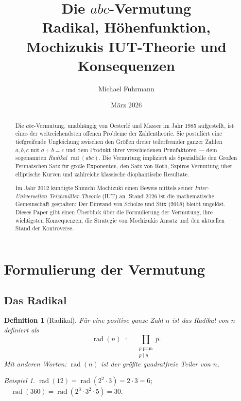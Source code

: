 \documentclass[12pt,a4paper]{article}
\title{\textbf{Die $abc$-Vermutung}\\[0.5em]
\large Radikal, Höhenfunktion, Mochizukis IUT-Theorie und Konsequenzen}
\author{Michael Fuhrmann}
\date{März 2026}
\newtheorem{definition}[theorem]{Definition}
\theoremstyle{remark}
\newtheorem{example}[theorem]{Beispiel}
\begin{document}
\maketitle
\begin{abstract}
Die $abc$-Vermutung, unabhängig von Oesterlé und Masser im Jahr 1985 aufgestellt, ist eines
der weitreichendsten offenen Probleme der Zahlentheorie. Sie postuliert eine tiefgreifende
Ungleichung zwischen den Größen dreier teilerfremder ganzer Zahlen $a, b, c$ mit $a+b=c$
und dem Produkt ihrer verschiedenen Primfaktoren — dem sogenannten \emph{Radikal}
$\operatorname{rad}(abc)$. Die Vermutung impliziert als Spezialfälle den Großen Fermatschen
Satz für große Exponenten, den Satz von Roth, Szpiros Vermutung über elliptische Kurven
und zahlreiche klassische diophantische Resultate.

Im Jahr 2012 kündigte Shinichi Mochizuki einen Beweis mittels seiner
\emph{Inter-Universellen Teichmüller-Theorie} (IUT) an. Stand 2026 ist die mathematische
Gemeinschaft gespalten: Der Einwand von Scholze und Stix (2018) bleibt ungelöst.
Dieses Paper gibt einen Überblick über die Formulierung der Vermutung, ihre wichtigsten
Konsequenzen, die Strategie von Mochizukis Ansatz und den aktuellen Stand der Kontroverse.
\end{abstract}

\tableofcontents
\newpage

\section{Formulierung der Vermutung}

\subsection{Das Radikal}

\begin{definition}[Radikal]
  Für eine positive ganze Zahl $n$ ist das \emph{Radikal} von $n$ definiert als
  \[
    \operatorname{rad}(n) \;:=\; \prod_{\substack{p\;\text{prim} \\ p \mid n}} p.
  \]
  Mit anderen Worten: $\operatorname{rad}(n)$ ist der größte quadratfreie Teiler von $n$.
\end{definition}

\begin{example}
  $\operatorname{rad}(12) = \operatorname{rad}(2^2\cdot 3) = 2\cdot 3 = 6$;
  $\quad \operatorname{rad}(360) = \operatorname{rad}(2^3\cdot 3^2\cdot 5) = 30$.
\end{example}
\end{document}
